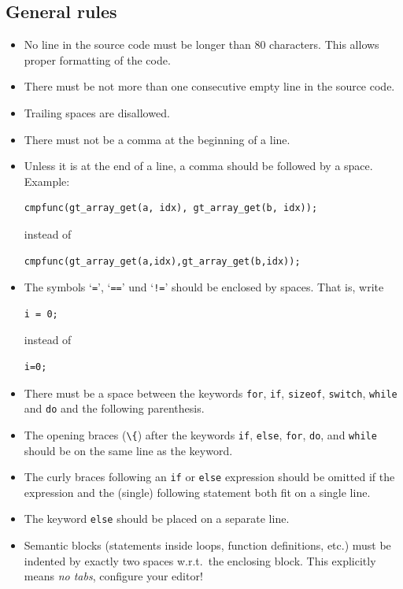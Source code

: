 \documentclass[11pt,final]{article}
\newcommand{\keyword}[1]{\lstinline{#1}}
\begin{document}
\subsection{General rules}
\begin{itemize}
\item
No line in the source code must be longer than 80 characters.
This allows proper formatting of the code.
\item
There must be not more than one consecutive empty line in the source code.
\item
Trailing spaces are disallowed.
\item
There must not be a comma at the beginning of a line.
\item
Unless it is at the end of a line, a comma should be followed by a space.
Example:

\begin{lstlisting}
cmpfunc(gt_array_get(a, idx), gt_array_get(b, idx));
\end{lstlisting}

instead of

\begin{lstlisting}
cmpfunc(gt_array_get(a,idx),gt_array_get(b,idx));
\end{lstlisting}

\item
The symbols `\keyword{=}', `\keyword{==}' und `\keyword{!=}' should be
enclosed by spaces. That is, write

\begin{lstlisting}
i = 0;
\end{lstlisting}

instead of

\begin{lstlisting}
i=0;
\end{lstlisting}
\item
There must be a space between the keywords \keyword{for}, \keyword{if},
\keyword{sizeof}, \keyword{switch}, \keyword{while} and \keyword{do} and the
following parenthesis.
\item
The opening braces (\keyword{\{}) after the keywords \keyword{if},
\keyword{else}, \keyword{for}, \keyword{do}, and \keyword{while} should be on
the same line as the keyword.
\item
The curly braces following an \keyword{if} or \keyword{else} expression should
be omitted if the expression and the (single) following statement both fit on
a single line.
\item
The keyword \keyword{else} should be placed on a separate line.
\item
Semantic blocks (statements inside loops, function definitions, etc.) must be
indented by exactly two spaces w.r.t.\ the enclosing block.
This explicitly means \emph{no tabs}, configure your editor!


\end{itemize}
\end{document}
